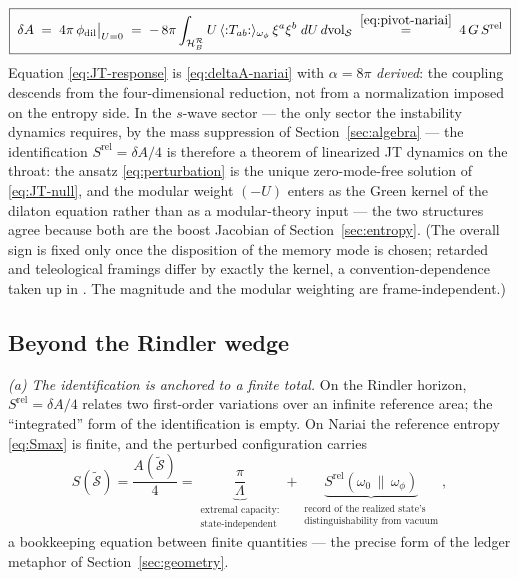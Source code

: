 \documentclass[11pt]{article}
\newcommand{\Srel}{S^{\mathrm{rel}}}
\newcommand{\Nariai}{Nariai}
\begin{document}
\begin{equation}
\boxed{\;
\delta A
\;=\; 4\pi\, \phi_{\mathrm{dil}}\big|_{U = 0}
\;=\; -\,8\pi \int_{\mathcal{H}_B^{\mathcal{R}}} U\, \langle{:}T_{ab}{:}\rangle_{\omega_\phi}\, \xi^a\xi^b\; dU\, d\mathrm{vol}_{\mathcal{S}}
\;\overset{\eqref{eq:pivot-nariai}}{=}\;
4\,G\, \Srel
\;}
\label{eq:JT-response}
\end{equation}
Equation \eqref{eq:JT-response} is \eqref{eq:deltaA-nariai} with $\alpha = 8\pi$ \emph{derived}: the coupling descends from the four-dimensional reduction, not from a normalization imposed on the entropy side. In the $s$-wave sector --- the only sector the instability dynamics requires, by the mass suppression of Section~\ref{sec:algebra} --- the identification $\Srel = \delta A/4$ is therefore a theorem of linearized JT dynamics on the throat: the ansatz \eqref{eq:perturbation} is the unique zero-mode-free solution of \eqref{eq:JT-null}, and the modular weight $(-U)$ enters as the Green kernel of the dilaton equation rather than as a modular-theory input --- the two structures agree because both are the boost Jacobian of Section~\ref{sec:entropy}. (The overall sign is fixed only once the disposition of the memory mode is chosen; retarded and teleological framings differ by exactly the kernel, a convention-dependence taken up in \cite{SuppNariai}. The magnitude and the modular weighting are frame-independent.)

\subsection{Beyond the Rindler wedge}

\emph{(a) The identification is anchored to a finite total.} On the Rindler horizon, $\Srel = \delta A/4$ relates two first-order variations over an infinite reference area; the ``integrated'' form of the identification is empty. On \Nariai{} the reference entropy \eqref{eq:Smax} is finite, and the perturbed configuration carries
\begin{equation}
S(\tilde{\mathcal{S}}) = \frac{A(\tilde{\mathcal{S}})}{4} =
\underbrace{\frac{\pi}{\Lambda}}_{\substack{\text{extremal capacity:}\\ \text{state-independent}}}
+ \underbrace{\Srel(\omega_0\,\|\,\omega_\phi)}_{\substack{\text{record of the realized state's}\\ \text{distinguishability from vacuum}}},
\label{eq:ledger}
\end{equation}
a bookkeeping equation between finite quantities --- the precise form of the ledger metaphor of Section~\ref{sec:geometry}.
\end{document}
